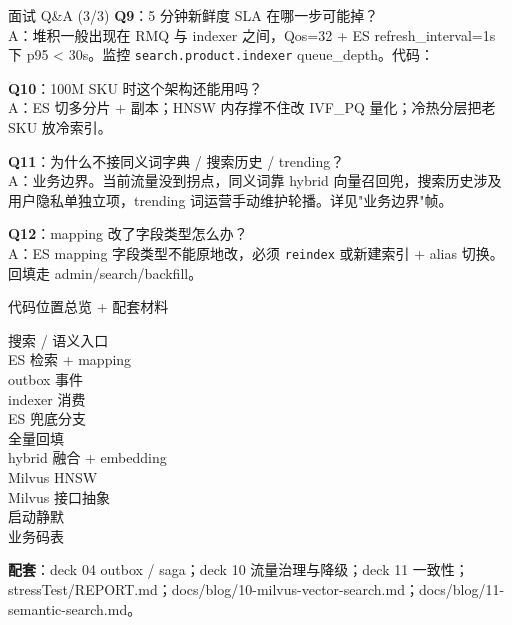 \documentclass[aspectratio=169,11pt]{beamer}
\begin{document}
\begin{frame}[shrink]{面试 Q\&A (3/3)}
\textbf{Q9}：5 分钟新鲜度 SLA 在哪一步可能掉？\\
\hspace{4mm}\small A：堆积一般出现在 RMQ 与 indexer 之间，Qos=32 + ES refresh\_interval=1s 下 p95 < 30s。监控 \texttt{search.product.indexer} queue\_depth。代码：

\vspace{2mm}
\textbf{Q10}：100M SKU 时这个架构还能用吗？\\
\hspace{4mm}\small A：ES 切多分片 + 副本；HNSW 内存撑不住改 IVF\_PQ 量化；冷热分层把老 SKU 放冷索引。

\vspace{2mm}
\textbf{Q11}：为什么不接同义词字典 / 搜索历史 / trending？\\
\hspace{4mm}\small A：业务边界。当前流量没到拐点，同义词靠 hybrid 向量召回兜，搜索历史涉及用户隐私单独立项，trending 词运营手动维护轮播。详见"业务边界"帧。

\vspace{2mm}
\textbf{Q12}：mapping 改了字段类型怎么办？\\
\hspace{4mm}\small A：ES mapping 字段类型不能原地改，必须 \texttt{reindex} 或新建索引 + alias 切换。回填走 admin/search/backfill。
\end{frame}

\begin{frame}[shrink]{代码位置总览 + 配套材料}
\footnotesize
\begin{description}
  \item[搜索 / 语义入口]
  \item[ES 检索 + mapping]
  \item[outbox 事件]
  \item[indexer 消费]
  \item[ES 兜底分支]
  \item[全量回填]
  \item[hybrid 融合 + embedding]
  \item[Milvus HNSW]
  \item[Milvus 接口抽象]
  \item[启动静默]
  \item[业务码表]
\end{description}
\vspace{2mm}
\small \textbf{配套}：deck 04 outbox / saga；deck 10 流量治理与降级；deck 11 一致性；stressTest/REPORT.md；docs/blog/10-milvus-vector-search.md；docs/blog/11-semantic-search.md。
\end{frame}
\end{document}

